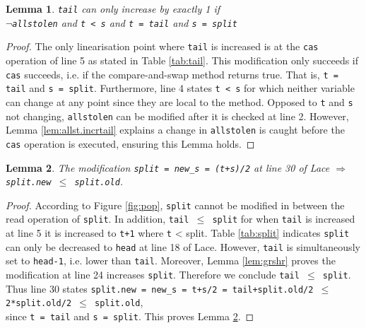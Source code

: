 \documentclass{sig-alternate-br}
\newtheorem{lemma}{Lemma}
\begin{document}
\begin{lemma}
	\texttt{tail} can only increase by exactly 1 if\\\texttt{$\neg$allstolen} and \texttt{t < s} and \texttt{t = tail} and \texttt{s = split}
	\label{lem:incrtail}
\end{lemma}
\begin{proof}
	The only linearisation point where \texttt{tail} is increased is at the \texttt{cas} operation of line 5 as stated in Table \ref{tab:tail}.
	This modification only succeeds if \texttt{cas} succeeds, i.e. if the compare-and-swap method returns true.
	That is, \texttt{t = tail} and \texttt{s = split}.
	Furthermore, line 4 states \texttt{t < s} for which neither variable can change at any point since they are local to the method.
	Opposed to \texttt{t} and \texttt{s} not changing, \texttt{allstolen} can be modified after it is checked at line 2.
	However, Lemma \ref{lem:allst.incrtail} explains a change in \texttt{allstolen} is caught before the \texttt{cas} operation is executed, ensuring this Lemma holds.	
\end{proof}

\begin{lemma}
	The modification \texttt{split = new\_s = (t+s)/2} at line 30 of Lace $\Rightarrow$ \texttt{split.new $\leq$ split.old}.
	\label{lem:lin30}
\end{lemma}
\begin{proof}
	According to Figure \ref{fig:pop}, \texttt{split} cannot be modified in between the read operation of \texttt{split}.
	In addition, \texttt{tail $\leq$ split} for when \texttt{tail} is increased at line 5 it is increased to \texttt{t+1} where \texttt{t} < split.
	Table \ref{tab:split} indicates \texttt{split} can only be decreased to \texttt{head} at line 18 of Lace.
	However, \texttt{tail} is simultaneously set to \texttt{head-1}, i.e. lower than \texttt{tail}.
	Moreover, Lemma \ref{lem:grshr} proves the modification at line 24 increases \texttt{split}.
	Therefore we conclude \texttt{tail $\leq$ split}.
	Thus line 30 states \texttt{split.new = new\_s = t+s/2 = tail+split.old/2 $\leq$ 2*split.old/2 $\leq$ split.old},\\since \texttt{t = tail} and \texttt{s = split}.
	This proves Lemma \ref{lem:lin30}.
\end{proof}
\end{document}

